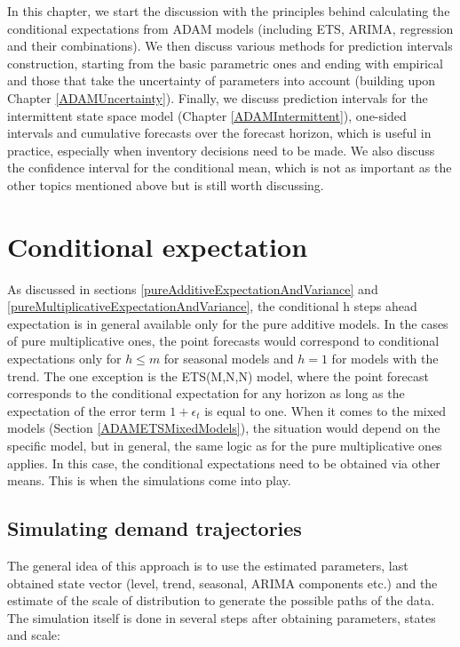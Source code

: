 \documentclass[
]{book}
\theoremstyle{definition}
\theoremstyle{definition}
\theoremstyle{definition}
\theoremstyle{definition}
\theoremstyle{remark}
\begin{document}
In this chapter, we start the discussion with the principles behind calculating the conditional expectations from ADAM models (including ETS, ARIMA, regression and their combinations). We then discuss various methods for prediction intervals construction, starting from the basic parametric ones and ending with empirical and those that take the uncertainty of parameters into account (building upon Chapter \ref{ADAMUncertainty}). Finally, we discuss prediction intervals for the intermittent state space model (Chapter \ref{ADAMIntermittent}), one-sided intervals and cumulative forecasts over the forecast horizon, which is useful in practice, especially when inventory decisions need to be made. We also discuss the confidence interval for the conditional mean, which is not as important as the other topics mentioned above but is still worth discussing.

\hypertarget{ADAMForecastingExpectation}{%
\section{Conditional expectation}\label{ADAMForecastingExpectation}}

As discussed in sections \ref{pureAdditiveExpectationAndVariance} and \ref{pureMultiplicativeExpectationAndVariance}, the conditional h steps ahead expectation is in general available only for the pure additive models. In the cases of pure multiplicative ones, the point forecasts would correspond to conditional expectations only for \(h \leq m\) for seasonal models and \(h=1\) for models with the trend. The one exception is the ETS(M,N,N) model, where the point forecast corresponds to the conditional expectation for any horizon as long as the expectation of the error term \(1+\epsilon_t\) is equal to one. When it comes to the mixed models (Section \ref{ADAMETSMixedModels}), the situation would depend on the specific model, but in general, the same logic as for the pure multiplicative ones applies. In this case, the conditional expectations need to be obtained via other means. This is when the simulations come into play.

\hypertarget{ADAMForecastingExpectationSimulations}{%
\subsection{Simulating demand trajectories}\label{ADAMForecastingExpectationSimulations}}

The general idea of this approach is to use the estimated parameters, last obtained state vector (level, trend, seasonal, ARIMA components etc.) and the estimate of the scale of distribution to generate the possible paths of the data. The simulation itself is done in several steps after obtaining parameters, states and scale:
\end{document}
